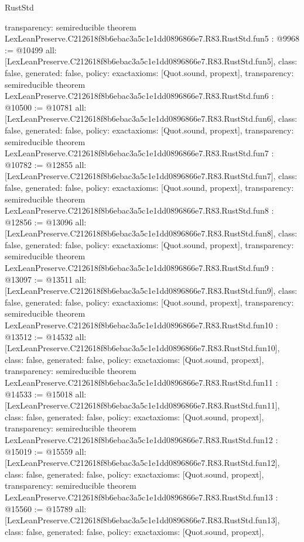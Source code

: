 \begin{lexlean}{RustStd}
\begin{coremodule}
{  transparency: semireducible
}
theorem LexLeanPreserve.C212618f8b6ebac3a5c1e1dd0896866e7.R83.RustStd.fun5 : @9968 := @10499 {
  all: [LexLeanPreserve.C212618f8b6ebac3a5c1e1dd0896866e7.R83.RustStd.fun5],
  class: false,
  generated: false,
  policy: exact{axioms: [Quot.sound, propext]},
  transparency: semireducible
}
theorem LexLeanPreserve.C212618f8b6ebac3a5c1e1dd0896866e7.R83.RustStd.fun6 : @10500 := @10781 {
  all: [LexLeanPreserve.C212618f8b6ebac3a5c1e1dd0896866e7.R83.RustStd.fun6],
  class: false,
  generated: false,
  policy: exact{axioms: [Quot.sound, propext]},
  transparency: semireducible
}
theorem LexLeanPreserve.C212618f8b6ebac3a5c1e1dd0896866e7.R83.RustStd.fun7 : @10782 := @12855 {
  all: [LexLeanPreserve.C212618f8b6ebac3a5c1e1dd0896866e7.R83.RustStd.fun7],
  class: false,
  generated: false,
  policy: exact{axioms: [Quot.sound, propext]},
  transparency: semireducible
}
theorem LexLeanPreserve.C212618f8b6ebac3a5c1e1dd0896866e7.R83.RustStd.fun8 : @12856 := @13096 {
  all: [LexLeanPreserve.C212618f8b6ebac3a5c1e1dd0896866e7.R83.RustStd.fun8],
  class: false,
  generated: false,
  policy: exact{axioms: [Quot.sound, propext]},
  transparency: semireducible
}
theorem LexLeanPreserve.C212618f8b6ebac3a5c1e1dd0896866e7.R83.RustStd.fun9 : @13097 := @13511 {
  all: [LexLeanPreserve.C212618f8b6ebac3a5c1e1dd0896866e7.R83.RustStd.fun9],
  class: false,
  generated: false,
  policy: exact{axioms: [Quot.sound, propext]},
  transparency: semireducible
}
theorem LexLeanPreserve.C212618f8b6ebac3a5c1e1dd0896866e7.R83.RustStd.fun10 : @13512 := @14532 {
  all: [LexLeanPreserve.C212618f8b6ebac3a5c1e1dd0896866e7.R83.RustStd.fun10],
  class: false,
  generated: false,
  policy: exact{axioms: [Quot.sound, propext]},
  transparency: semireducible
}
theorem LexLeanPreserve.C212618f8b6ebac3a5c1e1dd0896866e7.R83.RustStd.fun11 : @14533 := @15018 {
  all: [LexLeanPreserve.C212618f8b6ebac3a5c1e1dd0896866e7.R83.RustStd.fun11],
  class: false,
  generated: false,
  policy: exact{axioms: [Quot.sound, propext]},
  transparency: semireducible
}
theorem LexLeanPreserve.C212618f8b6ebac3a5c1e1dd0896866e7.R83.RustStd.fun12 : @15019 := @15559 {
  all: [LexLeanPreserve.C212618f8b6ebac3a5c1e1dd0896866e7.R83.RustStd.fun12],
  class: false,
  generated: false,
  policy: exact{axioms: [Quot.sound, propext]},
  transparency: semireducible
}
theorem LexLeanPreserve.C212618f8b6ebac3a5c1e1dd0896866e7.R83.RustStd.fun13 : @15560 := @15789 {
  all: [LexLeanPreserve.C212618f8b6ebac3a5c1e1dd0896866e7.R83.RustStd.fun13],
  class: false,
  generated: false,
  policy: exact{axioms: [Quot.sound, propext]},
}
\end{coremodule}
\end{lexlean}
